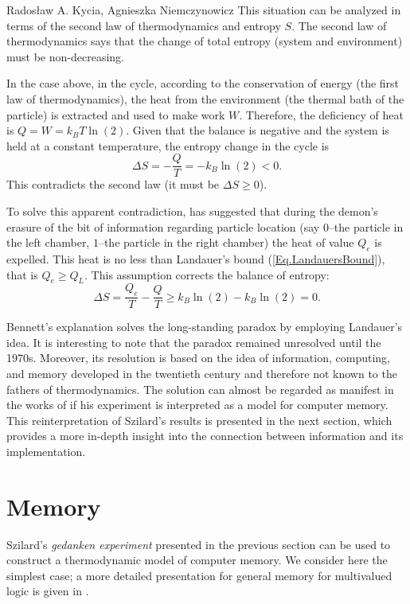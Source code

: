 \begin{artengenv2auth}{Rados\l aw A. Kycia, Agnieszka Niemczynowicz}
This situation can be analyzed in terms of the second law of thermodynamics and entropy $S$. The second law of thermodynamics says that the change of total entropy (system and environment) must be non-decreasing.

In the case above, in the cycle, according to the conservation of energy (the first law of thermodynamics), the heat from the environment (the thermal bath of the particle) is extracted and used to make work $W$. Therefore, the deficiency of heat is $Q=W=k_{B}T\ln(2)$. Given that the balance is negative and the system is held at a constant temperature, the entropy change in the cycle is
\begin{equation}
 \Delta S = -\frac{Q}{T}=-k_{B}\ln(2) <0.
\end{equation}
This contradicts the second law (it must be $\Delta S \geq0$).

To solve this apparent contradiction,  \textcites{BennetDemon} has suggested that during the demon's erasure of the bit of information regarding particle location (say $0$--the particle in the left chamber, $1$--the particle in the right chamber) the heat of value $Q_{e}$ is expelled. This heat is no less than Landauer's bound (\ref{Eq.LandauersBound}), that is $Q_{e} \geq Q_{L}$. This assumption corrects the balance of entropy:
\begin{equation}
 \Delta S = \frac{Q_{e}}{T}-\frac{Q}{T} \geq k_{B}\ln(2) - k_{B}\ln(2) =0.
\end{equation}

Bennett's explanation solves the long-standing paradox by employing Landauer's idea. It is interesting to note that the paradox remained unresolved until the 1970s. Moreover, its resolution is based on the idea of information, computing, and memory developed in the twentieth century and therefore not known to the fathers of thermodynamics. The solution can almost be regarded as manifest in the works of \textcites{Szilard} if his experiment is interpreted as a model for computer memory. This reinterpretation of Szilard's results is presented in the next section, which provides a more in-depth insight into the connection between information and its implementation.

\section{Memory}
Szilard's \textit{gedanken experiment} presented in the previous section can be used to construct a thermodynamic model of computer memory. We consider here the simplest case; a more detailed presentation for general memory for multivalued logic is given in \parencite{KyciaNiemczynowicz}.


\end{artengenv2auth}
